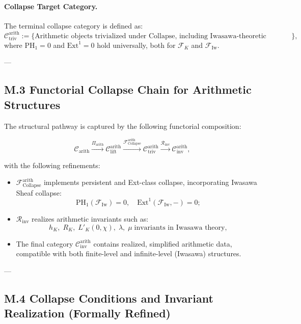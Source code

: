 \documentclass[11pt]{article}
\begin{document}
\paragraph{Collapse Target Category.}
The terminal collapse category is defined as:
\[
\mathcal{C}_{\mathrm{triv}}^{\mathrm{arith}} := \{ \text{Arithmetic objects trivialized under Collapse, including Iwasawa-theoretic refinements} \},
\]
where \( \mathrm{PH}_1 = 0 \) and \( \mathrm{Ext}^1 = 0 \) hold universally, both for \( \mathcal{F}_K \) and \( \mathcal{F}_{\mathrm{Iw}} \).

---

\subsection*{M.3 Functorial Collapse Chain for Arithmetic Structures}

The structural pathway is captured by the following functorial composition:

\[
\mathcal{C}_{\mathrm{arith}} 
\xrightarrow{\Pi_{\mathrm{arith}}} 
\mathcal{C}_{\mathrm{lift}}^{\mathrm{arith}} 
\xrightarrow{\mathcal{F}_{\mathrm{Collapse}}^{\mathrm{arith}}} 
\mathcal{C}_{\mathrm{triv}}^{\mathrm{arith}} 
\xrightarrow{\mathcal{R}_{\mathrm{inv}}} 
\mathcal{C}_{\mathrm{inv}}^{\mathrm{arith}},
\]

with the following refinements:
\begin{itemize}
  \item \( \mathcal{F}_{\mathrm{Collapse}}^{\mathrm{arith}} \) implements persistent and Ext-class collapse, incorporating Iwasawa Sheaf collapse:
  \[
  \mathrm{PH}_1(\mathcal{F}_{\mathrm{Iw}}) = 0, \quad \mathrm{Ext}^1(\mathcal{F}_{\mathrm{Iw}}, -) = 0;
  \]
  \item \( \mathcal{R}_{\mathrm{inv}} \) realizes arithmetic invariants such as:
  \[
  h_K,\; R_K,\; L'_K(0,\chi),\; \lambda,\;\mu\;\text{invariants in Iwasawa theory},
  \]
  \item The final category \( \mathcal{C}_{\mathrm{inv}}^{\mathrm{arith}} \) contains realized, simplified arithmetic data, compatible with both finite-level and infinite-level (Iwasawa) structures.
\end{itemize}

---

\subsection*{M.4 Collapse Conditions and Invariant Realization (Formally Refined)}
\end{document}
